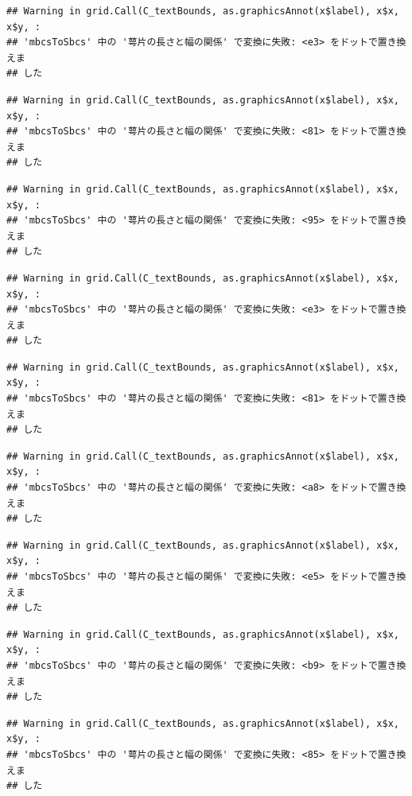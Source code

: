 \documentclass[
]{book}
\begin{document}
\begin{verbatim}
## Warning in grid.Call(C_textBounds, as.graphicsAnnot(x$label), x$x, x$y, :
## 'mbcsToSbcs' 中の '萼片の長さと幅の関係' で変換に失敗: <e3> をドットで置き換えま
## した
\end{verbatim}

\begin{verbatim}
## Warning in grid.Call(C_textBounds, as.graphicsAnnot(x$label), x$x, x$y, :
## 'mbcsToSbcs' 中の '萼片の長さと幅の関係' で変換に失敗: <81> をドットで置き換えま
## した
\end{verbatim}

\begin{verbatim}
## Warning in grid.Call(C_textBounds, as.graphicsAnnot(x$label), x$x, x$y, :
## 'mbcsToSbcs' 中の '萼片の長さと幅の関係' で変換に失敗: <95> をドットで置き換えま
## した
\end{verbatim}

\begin{verbatim}
## Warning in grid.Call(C_textBounds, as.graphicsAnnot(x$label), x$x, x$y, :
## 'mbcsToSbcs' 中の '萼片の長さと幅の関係' で変換に失敗: <e3> をドットで置き換えま
## した
\end{verbatim}

\begin{verbatim}
## Warning in grid.Call(C_textBounds, as.graphicsAnnot(x$label), x$x, x$y, :
## 'mbcsToSbcs' 中の '萼片の長さと幅の関係' で変換に失敗: <81> をドットで置き換えま
## した
\end{verbatim}

\begin{verbatim}
## Warning in grid.Call(C_textBounds, as.graphicsAnnot(x$label), x$x, x$y, :
## 'mbcsToSbcs' 中の '萼片の長さと幅の関係' で変換に失敗: <a8> をドットで置き換えま
## した
\end{verbatim}

\begin{verbatim}
## Warning in grid.Call(C_textBounds, as.graphicsAnnot(x$label), x$x, x$y, :
## 'mbcsToSbcs' 中の '萼片の長さと幅の関係' で変換に失敗: <e5> をドットで置き換えま
## した
\end{verbatim}

\begin{verbatim}
## Warning in grid.Call(C_textBounds, as.graphicsAnnot(x$label), x$x, x$y, :
## 'mbcsToSbcs' 中の '萼片の長さと幅の関係' で変換に失敗: <b9> をドットで置き換えま
## した
\end{verbatim}

\begin{verbatim}
## Warning in grid.Call(C_textBounds, as.graphicsAnnot(x$label), x$x, x$y, :
## 'mbcsToSbcs' 中の '萼片の長さと幅の関係' で変換に失敗: <85> をドットで置き換えま
## した
\end{verbatim}
\end{document}
